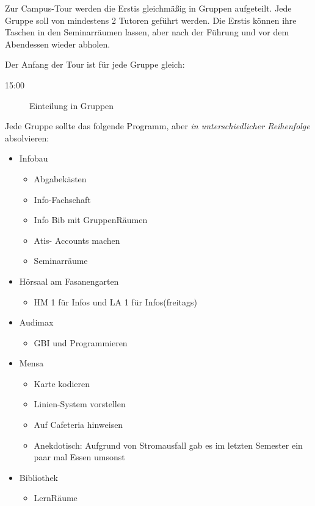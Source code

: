 \documentclass[10pt,twocolumn,ngerman]{scrartcl}
\begin{document}
Zur Campus-Tour werden die Erstis gleichmäßig in Gruppen aufgeteilt.
Jede Gruppe soll von mindestens 2 Tutoren geführt werden. Die Erstis
können ihre Taschen in den Seminarräumen lassen, aber nach der Führung
und vor dem Abendessen wieder abholen.

Der Anfang der Tour ist für jede Gruppe gleich:
\begin{description}
    \item [{15:00}] Einteilung in Gruppen\setlength{\itemsep}{0pt}
\end{description}
Jede Gruppe sollte das folgende Programm, aber \emph{in unterschiedlicher Reihenfolge} absolvieren:
\begin{itemize}
    \item Infobau
        \begin{itemize}
            \item Abgabekästen
            \item Info-Fachschaft
            \item Info Bib mit GruppenRäumen
            \item Atis- Accounts machen
            \item Seminarräume
        \end{itemize}
    \item Hörsaal am Fasanengarten
        \begin{itemize}
            \item HM 1 für Infos und LA 1 für Infos(freitags)
        \end{itemize}
    \item Audimax
        \begin{itemize}
            \item GBI und Programmieren
        \end{itemize}
    \item Mensa
        \begin{itemize}
            \item Karte kodieren
            \item Linien-System vorstellen
            \item Auf Cafeteria hinweisen
            \item Anekdotisch: Aufgrund von Stromausfall gab es im letzten Semester ein paar mal Essen umsonst
        \end{itemize}
    \item Bibliothek
        \begin{itemize}
            \item LernRäume

\end{itemize}
\end{itemize}
\end{document}
